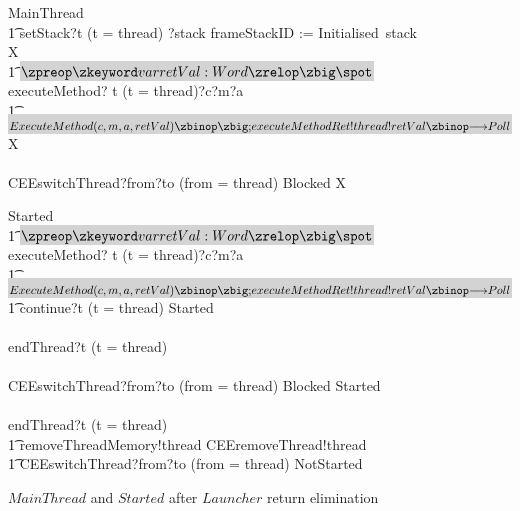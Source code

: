 \begin{figure}[tp!]
  \centering
  \setlength{\zedtab}{0.4cm}
  \setlength{\zedindent}{0pt}
  \setlength{\zedleftsep}{0pt}
  \setlength{\abovedisplayskip}{0pt}
  \setlength{\belowdisplayskip}{0pt}
  \setlength{\abovedisplayshortskip}{0pt}
  \setlength{\belowdisplayshortskip}{0pt}
  \begin{circusaction}
    MainThread \circdef \\
    \t1 setStack?t \prefixcolon (t = thread) ?stack \then frameStackID := Initialised~stack \circseq \circmu X \circspot \\
    \t1 \circblockbegin
    \colorbox{lightgray}{$\circvar retVal : Word \circspot$}
    executeMethod? t \prefixcolon (t = thread)?c?m?a \then {} \\
    \t1 \colorbox{lightgray}{$ExecuteMethod(c, m, a, retVal) \circseq
    executeMethodRet!thread!retVal \then Poll$} \circseq  X \\
    {} \extchoice {} \\
    CEEswitchThread?from?to \prefixcolon (from = thread) \then Blocked \circseq X
    \circblockend
  \end{circusaction}
  
  \begin{circusaction}
    Started \circdef \\
    \t1 \circblockbegin
    \colorbox{lightgray}{$\circvar retVal : Word \circspot$} executeMethod? t \prefixcolon (t = thread)?c?m?a \then {} \circseq \\
    \t1 \colorbox{lightgray}{$ExecuteMethod(c, m, a, retVal) \circseq executeMethodRet!thread!retVal \then Poll$} \circseq \\
    \t1 \circblockbegin
    continue?t \prefixcolon (t = thread) \then Started \\
    {} \extchoice {} \\
    endThread?t \prefixcolon (t = thread) \then \Skip
    \circblockend \\
    {} \extchoice {} \\
    CEEswitchThread?from?to \prefixcolon (from = thread) \then Blocked \circseq Started \\
    {} \extchoice {} \\
    endThread?t \prefixcolon (t = thread) \then \Skip
    \circblockend \circseq \\
    \t1 removeThreadMemory!thread \then CEEremoveThread!thread \\
    \t1 {} \then CEEswitchThread?from?to \prefixcolon (from = thread) \then NotStarted
  \end{circusaction}
  \caption{$MainThread$ and $Started$ after $Launcher$ return
    elimination}
  \label{efs-eliminate-returns-MainThread-Started-figure}
\end{figure}

